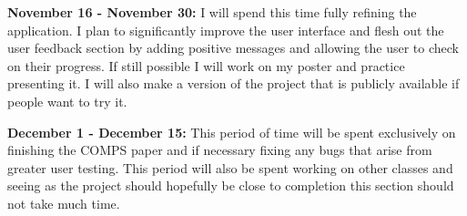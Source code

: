 \documentclass[10pt,twocolumn]{article}
\begin{document}
\textbf{November 16 - November 30:}
I will spend this time fully refining the application. I plan to significantly improve the user interface and flesh out the user feedback section by adding positive messages and allowing the user to check on their progress. If still possible I will work on my poster and practice presenting it. I will also make a version of the project that is publicly available if people want to try it.

\textbf{December 1 - December 15:}
This period of time will be spent exclusively on finishing the COMPS paper and if necessary fixing any bugs that arise from greater user testing. This period will also be spent working on other classes and seeing as the project should hopefully be close to completion this section should not take much time.
 



    

\printbibliography
\end{document}
